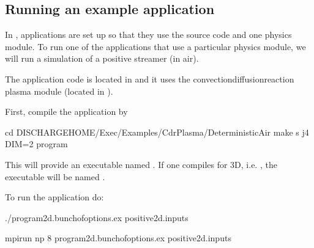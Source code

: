\documentclass[letterpaper,10pt,english]{sphinxmanual}
\begin{document}
\subsection{Running an example application}
\label{\detokenize{Base/Installation:running-an-example-application}}
\sphinxAtStartPar
In , applications are set up so that they use the  source code and one  physics module.
To run one of the applications that use a particular  physics module, we will run a simulation of a positive streamer (in air).

\sphinxAtStartPar
The application code is located in  and it uses the convection\sphinxhyphen{}diffusion\sphinxhyphen{}reaction plasma module (located in ).

\sphinxAtStartPar
First, compile the application by

\begin{sphinxVerbatim}[commandchars=\\\{\},formatcom=\scriptsize]
cd \PYGZdl{}DISCHARGE\PYGZus{}HOME/Exec/Examples/CdrPlasma/DeterministicAir
make \PYGZhy{}s \PYGZhy{}j4 DIM=2 program
\end{sphinxVerbatim}

\sphinxAtStartPar
This will provide an executable named .
If one compiles for 3D, i.e. , the executable will be named .

\sphinxAtStartPar
To run the application do:

\sphinxAtStartPar
{}

\begin{sphinxVerbatim}[commandchars=\\\{\},formatcom=\scriptsize]
./program2d.\PYGZlt{}bunch\PYGZus{}of\PYGZus{}options\PYGZgt{}.ex positive2d.inputs
\end{sphinxVerbatim}

\sphinxAtStartPar
{}

\begin{sphinxVerbatim}[commandchars=\\\{\},formatcom=\scriptsize]
mpirun \PYGZhy{}np 8 program2d.\PYGZlt{}bunch\PYGZus{}of\PYGZus{}options\PYGZgt{}.ex positive2d.inputs
\end{sphinxVerbatim}
\end{document}
